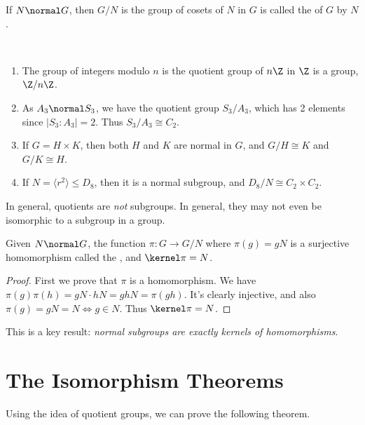 \documentclass[a4]{scrreprt}
\newcommand{\newsection}{\section}
\begin{document}
\begin{definition}
	If $N \normal G$, then $G/N$ is the group of cosets of $N$ in $G$ is called the  of $G$ by $N$.
\end{definition}

\begin{example}~
	    \vspace*{-1.5\baselineskip}
	\begin{enumerate}[label=(\roman*)]
		\item The group of integers modulo $n$ is the quotient group of $n\Z$ in $\Z$ is a group, $\Z/n\Z$.
		\item As $A_3 \normal S_3$, we have the quotient group $S_3/A_3$, which has 2 elements since $|S_3 : A_3| = 2$. Thus $S_3 / A_3 \cong C_2$.
		\item If $G = H \times K$, then both $H$ and $K$ are normal in $G$, and $G/H \cong K$ and $G/K \cong H$.
		\item If $N = \langle r^2 \rangle \leq D_8$, then it is a normal subgroup, and $D_8/N \cong C_2 \times C_2$. 
	\end{enumerate}
\end{example}

\begin{remark}
	In general, quotients are \emph{not} subgroups. In general, they may not even be isomorphic to a subgroup in a group.
\end{remark}

\begin{theorem}
	Given $N \normal G$, the function $\pi : G \rightarrow G/N$ where $\pi(g) = gN$ is a surjective homomorphism called the , and $\kernel \pi = N$.
\end{theorem}
\begin{proof}
	First we prove that $\pi$ is a homomorphism. We have $\pi(g)\pi(h) = gN \cdot hN = gh N = \pi(gh)$. It's clearly injective, and also $\pi(g)= gN = N \iff g \in N$. Thus $\kernel \pi = N$.
\end{proof}

This is a key result: \emph{normal subgroups are exactly kernels of homomorphisms}.

\newsection{The Isomorphism Theorems}

Using the idea of quotient groups, we can prove the following theorem.
\end{document}
